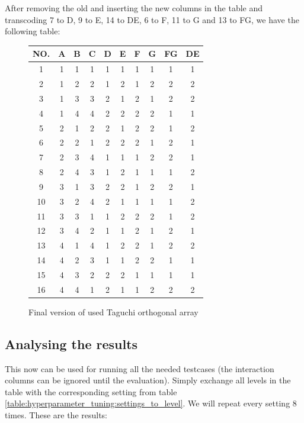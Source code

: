 After removing the old and inserting the new columns in the table and transcoding 7 to D, 9 to E, 14 to DE, 6 to F, 11 to G and 13 to FG, we have the following table:

\begin{figure}[H]
	\centering
	\begin{tabular}{ |c||c|c|c|c|c|c|c|c|c|  }
		\hline
		NO.& A & B & C & D & E & F & G & FG& DE\\
		\hline
		1  & 1 & 1 & 1 & 1 & 1 & 1 & 1 & 1 & 1\\
		2  & 1 & 2 & 2 & 1 & 2 & 1 & 2 & 2 & 2\\
		3  & 1 & 3 & 3 & 2 & 1 & 2 & 1 & 2 & 2\\
		4  & 1 & 4 & 4 & 2 & 2 & 2 & 2 & 1 & 1\\
		5  & 2 & 1 & 2 & 2 & 1 & 2 & 2 & 1 & 2\\
		6  & 2 & 2 & 1 & 2 & 2 & 2 & 1 & 2 & 1\\
		7  & 2 & 3 & 4 & 1 & 1 & 1 & 2 & 2 & 1\\
		8  & 2 & 4 & 3 & 1 & 2 & 1 & 1 & 1 & 2\\
		9  & 3 & 1 & 3 & 2 & 2 & 1 & 2 & 2 & 1\\
		10 & 3 & 2 & 4 & 2 & 1 & 1 & 1 & 1 & 2\\
		11 & 3 & 3 & 1 & 1 & 2 & 2 & 2 & 1 & 2\\
		12 & 3 & 4 & 2 & 1 & 1 & 2 & 1 & 2 & 1\\
		13 & 4 & 1 & 4 & 1 & 2 & 2 & 1 & 2 & 2\\
		14 & 4 & 2 & 3 & 1 & 1 & 2 & 2 & 1 & 1\\
		15 & 4 & 3 & 2 & 2 & 2 & 1 & 1 & 1 & 1\\
		16 & 4 & 4 & 1 & 2 & 1 & 1 & 2 & 2 & 2\\
		\hline
	\end{tabular}
	\caption{Final version of used Taguchi orthogonal array}
\end{figure}


\subsection{Analysing the results}
\label{chap:hyperparameter_tuning:analysis_of_results}
This now can be used for running all the needed testcases (the interaction columns can be ignored until the evaluation). Simply exchange all levels in the table with the corresponding setting from table \ref{table:hyperparameter_tuning:settings_to_level}. We will repeat every setting 8 times. These are the results:


